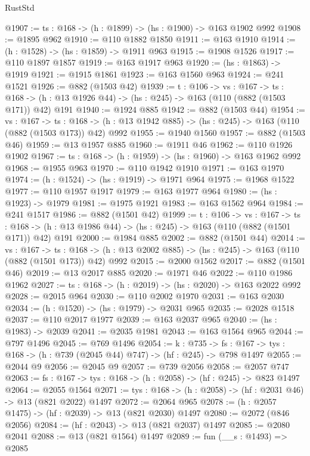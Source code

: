 \begin{lexlean}{RustStd}
\begin{coremodule}
@1907 := {ts : @168} -> (h : @1899) -> (hs : @1900) -> @163 @1902 @992
@1908 := @1895 @962
@1910 := @110 @1882 @1850
@1911 := @163 @1910
@1914 := (h : @1528) -> (hs : @1859) -> @1911 @963
@1915 := @1908 @1526
@1917 := @110 @1897 @1857
@1919 := @163 @1917 @963
@1920 := (hs : @1863) -> @1919
@1921 := @1915 @1861
@1923 := @163 @1560 @963
@1924 := @241 @1521
@1926 := @882 (@1503 @42)
@1939 := {t : @106} ->
  {vs : @167} ->
  {ts : @168} -> (h : @13 @1926 @44) -> (hs : @245) -> @163 (@110 (@882 (@1503 @171)) @42) @191
@1940 := @1924 @885
@1942 := @882 (@1503 @44)
@1954 := {vs : @167} ->
  {ts : @168} -> (h : @13 @1942 @885) -> (hs : @245) -> @163 (@110 (@882 (@1503 @173)) @42) @992
@1955 := @1940 @1560
@1957 := @882 (@1503 @46)
@1959 := @13 @1957 @885
@1960 := @1911 @46
@1962 := @110 @1926 @1902
@1967 := {ts : @168} -> (h : @1959) -> (hs : @1960) -> @163 @1962 @992
@1968 := @1955 @963
@1970 := @110 @1942 @1910
@1971 := @163 @1970
@1974 := (h : @1524) -> (hs : @1919) -> @1971 @964
@1975 := @1968 @1522
@1977 := @110 @1957 @1917
@1979 := @163 @1977 @964
@1980 := (hs : @1923) -> @1979
@1981 := @1975 @1921
@1983 := @163 @1562 @964
@1984 := @241 @1517
@1986 := @882 (@1501 @42)
@1999 := {t : @106} ->
  {vs : @167} ->
  {ts : @168} -> (h : @13 @1986 @44) -> (hs : @245) -> @163 (@110 (@882 (@1501 @171)) @42) @191
@2000 := @1984 @885
@2002 := @882 (@1501 @44)
@2014 := {vs : @167} ->
  {ts : @168} -> (h : @13 @2002 @885) -> (hs : @245) -> @163 (@110 (@882 (@1501 @173)) @42) @992
@2015 := @2000 @1562
@2017 := @882 (@1501 @46)
@2019 := @13 @2017 @885
@2020 := @1971 @46
@2022 := @110 @1986 @1962
@2027 := {ts : @168} -> (h : @2019) -> (hs : @2020) -> @163 @2022 @992
@2028 := @2015 @964
@2030 := @110 @2002 @1970
@2031 := @163 @2030
@2034 := (h : @1520) -> (hs : @1979) -> @2031 @965
@2035 := @2028 @1518
@2037 := @110 @2017 @1977
@2039 := @163 @2037 @965
@2040 := (hs : @1983) -> @2039
@2041 := @2035 @1981
@2043 := @163 @1564 @965
@2044 := @797 @1496
@2045 := @769 @1496
@2054 := {k : @735} ->
  {fs : @167} -> {tys : @168} -> (h : @739 (@2045 @44) @747) -> (hf : @245) -> @798 @1497
@2055 := @2044 @9
@2056 := @2045 @9
@2057 := @739 @2056
@2058 := @2057 @747
@2063 := {fs : @167} -> {tys : @168} -> (h : @2058) -> (hf : @245) -> @823 @1497
@2064 := @2055 @1564
@2071 := {tys : @168} -> (h : @2058) -> (hf : @2031 @46) -> @13 (@821 @2022) @1497
@2072 := @2064 @965
@2078 := (h : @2057 @1475) -> (hf : @2039) -> @13 (@821 @2030) @1497
@2080 := @2072 (@846 @2056)
@2084 := (hf : @2043) -> @13 (@821 @2037) @1497
@2085 := @2080 @2041
@2088 := @13 (@821 @1564) @1497
@2089 := fun (__s : @1493) => @2085

\end{coremodule}
\end{lexlean}
